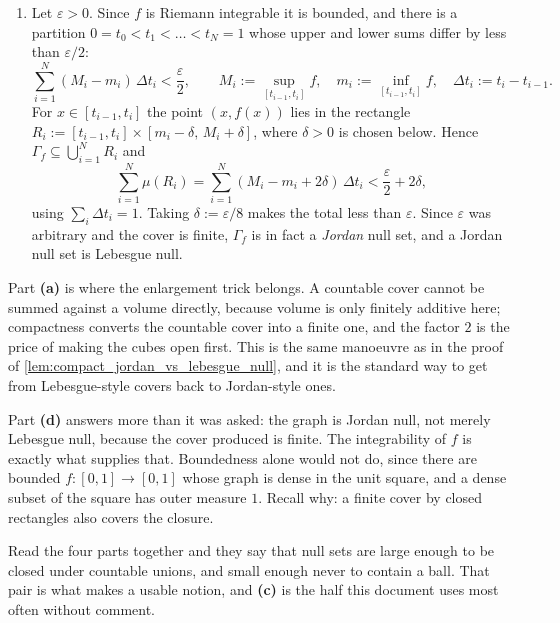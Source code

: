 \begin{exercisesolution}
\begin{enumerate}[label=\textbf{(\alph*)}]
  \item Let $\varepsilon > 0$. Since $f$ is Riemann integrable it is bounded, and there is a
    partition $0 = t_0 < t_1 < \dots < t_N = 1$ whose upper and lower sums differ by less than
    $\varepsilon/2$:
\[\sum_{i=1}^N (M_i - m_i)\,\Delta t_i < \frac{\varepsilon}{2}, \qquad
  M_i := \sup_{[t_{i-1},t_i]} f, \quad m_i := \inf_{[t_{i-1},t_i]} f, \quad
  \Delta t_i := t_i - t_{i-1}.\]
    For $x \in [t_{i-1},t_i]$ the point $(x,f(x))$ lies in the rectangle
    $R_i := [t_{i-1},t_i]\times[m_i-\delta,\,M_i+\delta]$, where $\delta > 0$ is chosen below.
    Hence $\Gamma_f \subseteq \bigcup_{i=1}^N R_i$ and
\[\sum_{i=1}^N \mu(R_i) = \sum_{i=1}^N (M_i - m_i + 2\delta)\,\Delta t_i
  < \frac{\varepsilon}{2} + 2\delta,\]
    using $\sum_i \Delta t_i = 1$. Taking $\delta := \varepsilon/8$ makes the total less than
    $\varepsilon$. Since $\varepsilon$ was arbitrary and the cover is finite, $\Gamma_f$ is in fact
    a \emph{Jordan} null set, and a Jordan null set is Lebesgue null.
\end{enumerate}
\begin{remark}
Part \textbf{(a)} is where the enlargement trick belongs. A countable cover cannot be summed
against a volume directly, because volume is only finitely additive here; compactness converts the
countable cover into a finite one, and the factor $2$ is the price of making the cubes open first.
This is the same manoeuvre as in the proof of \cref{lem:compact_jordan_vs_lebesgue_null}, and it is
the standard way to get from Lebesgue-style covers back to Jordan-style ones.

Part \textbf{(d)} answers more than it was asked: the graph is Jordan null, not merely Lebesgue
null, because the cover produced is finite. The integrability of $f$ is exactly what supplies that.
Boundedness alone would not do, since there are bounded $f : [0,1]\to[0,1]$ whose graph is dense in
the unit square, and a dense subset of the square has outer measure $1$. Recall why: a finite cover
by closed rectangles also covers the closure.

Read the four parts together and they say that null sets are large enough to be closed under
countable unions, and small enough never to contain a ball. That pair is what makes 
a usable notion, and \textbf{(c)} is the half this document uses most often without comment.
\end{remark}
\end{exercisesolution}

